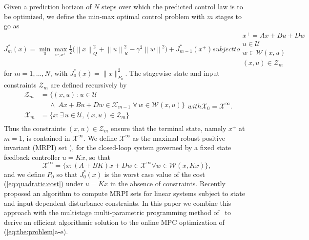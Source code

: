 \documentclass{ifacconf}
\providecommand{\norm}[1]{\left\|#1\right\|}
\begin{document}
Given a prediction horizon of $N$ steps over which the predicted control law is to be optimized, we define the
min-max optimal control problem with $m$ stages to go as
%
\begin{subequations}\label{eq:the:problem}%
\begin{equation}
	J_{m}^\ast(x) = \min_u \max_{w,x^+} \tfrac{1}{2}\bigl(\norm{x}_Q^2+\norm{u}_R^2-\gamma^2
    \norm{w}^2\bigr) + J_{m-1}^\ast(x^+)
\end{equation}
subject to
\begin{gather}
	x^+ = A x + B u + D w\\
	u\in\mathcal U \\
	w\in\mathcal W(x,u) \\
	(x,u)\in\mathcal Z_m
\end{gather}
\end{subequations}
%
for $m=1,\ldots,N$, with $J_0^\ast(x) = \|x\|_{P_0}^2$.
The stagewise  state and input constraints $\mathcal Z_m$ are defined recursively by
%
\begin{subequations}\label{eq:definition:stage:constraints}
\begin{align}
	\mathcal Z_m &= \{(x,u)\,: u\in\mathcal U \nonumber\\
	&\quad\ \wedge \; A x + Bu + Dw\in\mathcal X_{m-1}\; \forall\, w\in\mathcal W(x,u)\} 
	\label{eq:definition:mixed:stage:constraint}\\
	\mathcal X_m &= \{x : \exists\, u\in\mathcal U, (x,u)\in\mathcal Z_m\}
	\label{eq:definition:state:stage:constraint}\\
\end{align}
with
\begin{equation}
	\mathcal X_0 = \mathcal X^\infty .
\end{equation}
\end{subequations}
Thus the constraints $(x,u)\in\mathcal Z_m$ ensure that the terminal state, namely $x^+$ at $m=1$, is
contained in $\mathcal{X}^\infty$. We define $\mathcal{X}^\infty$ as the maximal robust positive invariant (MRPI) set \citep{blanchini:2007}), for the closed-loop system governed by a fixed state feedback controller
$u=Kx$, so that 
%
\begin{equation}\label{eq:definition:MRPI:set}
	\mathcal X^\infty = \{x: (A+BK)x + Dw \in \mathcal X^\infty \forall w\in\mathcal W(x,Kx)\},
\end{equation}
%
and we define $P_0$ so that $J_0^\ast(x)$ is the worst case value of the cost (\ref{eq:quadratic:cost}) under
$u=Kx$ in the absence of constraints.
Recently~\cite{Schaich:2015} proposed an algorithm to compute MRPI sets
for linear systems subject to state and input dependent disturbance constraints. In this paper we combine this approach
with the multistage multi-parametric programming method of~\cite{Buerger:ACC} to derive an efficient algorithmic
solution to the online MPC optimization of (\ref{eq:the:problem}a-e).
\end{document}
